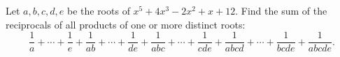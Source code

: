 Let $a,b,c,d,e$ be the roots of $x^5+4x^3-2x^2+x+12$. Find the sum of the reciprocals of all products of one or more distinct roots:
\[\dfrac1a+\cdots+\dfrac1e+\dfrac1{ab}+\cdots+\dfrac1{de}+\dfrac1{abc}+\cdots+\dfrac1{cde}+\dfrac1{abcd}+\cdots+\dfrac1{bcde}+\dfrac1{abcde}.\]
